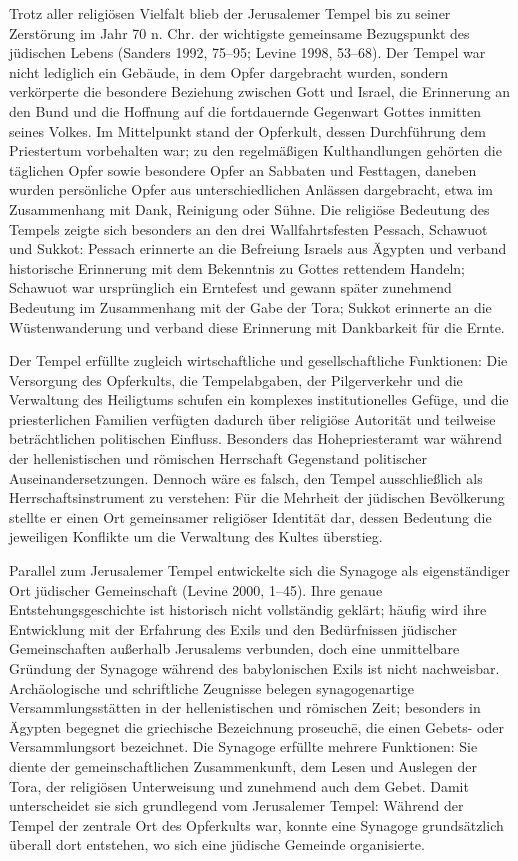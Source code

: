 \documentclass[fontsize=12pt]{mybib}
\begin{document}
Trotz aller religiösen Vielfalt blieb der Jerusalemer Tempel bis zu seiner Zerstörung im Jahr 70 n. Chr. der wichtigste gemeinsame Bezugspunkt des jüdischen Lebens (Sanders 1992, 75–95; Levine 1998, 53–68). Der Tempel war nicht lediglich ein Gebäude, in dem Opfer dargebracht wurden, sondern verkörperte die besondere Beziehung zwischen Gott und Israel, die Erinnerung an den Bund und die Hoffnung auf die fortdauernde Gegenwart Gottes inmitten seines Volkes. Im Mittelpunkt stand der Opferkult, dessen Durchführung dem Priestertum vorbehalten war; zu den regelmäßigen Kulthandlungen gehörten die täglichen Opfer sowie besondere Opfer an Sabbaten und Festtagen, daneben wurden persönliche Opfer aus unterschiedlichen Anlässen dargebracht, etwa im Zusammenhang mit Dank, Reinigung oder Sühne. Die religiöse Bedeutung des Tempels zeigte sich besonders an den drei Wallfahrtsfesten Pessach, Schawuot und Sukkot: Pessach erinnerte an die Befreiung Israels aus Ägypten und verband historische Erinnerung mit dem Bekenntnis zu Gottes rettendem Handeln; Schawuot war ursprünglich ein Erntefest und gewann später zunehmend Bedeutung im Zusammenhang mit der Gabe der Tora; Sukkot erinnerte an die Wüstenwanderung und verband diese Erinnerung mit Dankbarkeit für die Ernte.

Der Tempel erfüllte zugleich wirtschaftliche und gesellschaftliche Funktionen: Die Versorgung des Opferkults, die Tempelabgaben, der Pilgerverkehr und die Verwaltung des Heiligtums schufen ein komplexes institutionelles Gefüge, und die priesterlichen Familien verfügten dadurch über religiöse Autorität und teilweise beträchtlichen politischen Einfluss. Besonders das Hohepriesteramt war während der hellenistischen und römischen Herrschaft Gegenstand politischer Auseinandersetzungen. Dennoch wäre es falsch, den Tempel ausschließlich als Herrschaftsinstrument zu verstehen: Für die Mehrheit der jüdischen Bevölkerung stellte er einen Ort gemeinsamer religiöser Identität dar, dessen Bedeutung die jeweiligen Konflikte um die Verwaltung des Kultes überstieg.

Parallel zum Jerusalemer Tempel entwickelte sich die Synagoge als eigenständiger Ort jüdischer Gemeinschaft (Levine 2000, 1–45). Ihre genaue Entstehungsgeschichte ist historisch nicht vollständig geklärt; häufig wird ihre Entwicklung mit der Erfahrung des Exils und den Bedürfnissen jüdischer Gemeinschaften außerhalb Jerusalems verbunden, doch eine unmittelbare Gründung der Synagoge während des babylonischen Exils ist nicht nachweisbar. Archäologische und schriftliche Zeugnisse belegen synagogenartige Versammlungsstätten in der hellenistischen und römischen Zeit; besonders in Ägypten begegnet die griechische Bezeichnung proseuchē, die einen Gebets- oder Versammlungsort bezeichnet. Die Synagoge erfüllte mehrere Funktionen: Sie diente der gemeinschaftlichen Zusammenkunft, dem Lesen und Auslegen der Tora, der religiösen Unterweisung und zunehmend auch dem Gebet. Damit unterscheidet sie sich grundlegend vom Jerusalemer Tempel: Während der Tempel der zentrale Ort des Opferkults war, konnte eine Synagoge grundsätzlich überall dort entstehen, wo sich eine jüdische Gemeinde organisierte.
\end{document}
